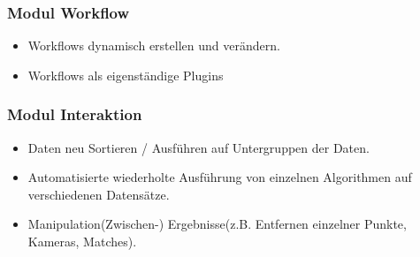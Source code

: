 \subsubsection{Modul Workflow}
\begin{itemize}
\item Workflows dynamisch erstellen und verändern.
\item Workflows als eigenständige Plugins
\end{itemize} 
\subsubsection{Modul Interaktion}
\begin{itemize}
\item Daten neu Sortieren / Ausführen auf Untergruppen der Daten.
\item Automatisierte wiederholte Ausführung von einzelnen Algorithmen auf verschiedenen Datensätze.
\item Manipulation(Zwischen-) Ergebnisse(z.B. Entfernen einzelner Punkte, Kameras, Matches).
\end{itemize}
